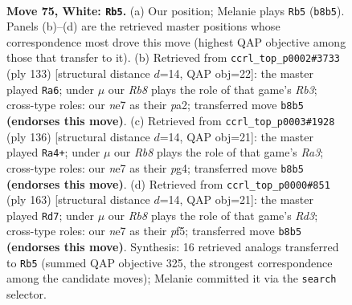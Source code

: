 \documentclass[11pt]{article}
\begin{document}
\clearpage

\begin{figure}[p]\centering
\begin{subfigure}{0.46\textwidth}\centering
\resizebox{\linewidth}{!}{%
\newchessgame
\chessboard[
  setfen={1R6/3kn3/8/8/p6r/P6p/7K/8 w - - 8 75},
  showmover=false,
  pgfstyle=straightmove, color=movearrow, markmove={b8-b5}
]}
\caption{}
\end{subfigure}\hfill
\begin{subfigure}{0.46\textwidth}\centering
\resizebox{\linewidth}{!}{%
\newchessgame
\chessboard[
  setfen={8/8/1r6/8/8/4k3/P1R1P3/K7 b - - 26 67},
  showmover=false,
  pgfstyle=straightmove, color=movearrow, markmove={b6-a6}
]}
\caption{}
\end{subfigure}
\\[4pt]
\begin{subfigure}{0.46\textwidth}\centering
\resizebox{\linewidth}{!}{%
\newchessgame
\chessboard[
  setfen={8/8/8/8/5kpr/R7/7p/7K w - - 10 69},
  showmover=false,
  pgfstyle=straightmove, color=movearrow, markmove={a3-a4}
]}
\caption{}
\end{subfigure}\hfill
\begin{subfigure}{0.46\textwidth}\centering
\resizebox{\linewidth}{!}{%
\newchessgame
\chessboard[
  setfen={7k/7P/3r4/5P1R/5K2/8/8/8 b - - 12 82},
  showmover=false,
  pgfstyle=straightmove, color=movearrow, markmove={d6-d7}
]}
\caption{}
\end{subfigure}
\caption{\textbf{Move 75, White: \texttt{Rb5}.} (a) Our position; Melanie plays \texttt{Rb5} (\texttt{b8b5}). Panels (b)--(d) are the retrieved master positions whose correspondence most drove this move (highest QAP objective among those that transfer to it). (b) Retrieved from \texttt{ccrl\_top\_p0002\#3733} (ply 133) [structural distance $d$=14, QAP obj=22]: the master played \texttt{Ra6}; under $\mu$ our \emph{Rb8} plays the role of that game's \emph{Rb3}; cross-type roles: our \emph{n}e7 as their \emph{p}a2; transferred move \texttt{b8b5} \textbf{(endorses this move)}. (c) Retrieved from \texttt{ccrl\_top\_p0003\#1928} (ply 136) [structural distance $d$=14, QAP obj=21]: the master played \texttt{Ra4+}; under $\mu$ our \emph{Rb8} plays the role of that game's \emph{Ra3}; cross-type roles: our \emph{n}e7 as their \emph{p}g4; transferred move \texttt{b8b5} \textbf{(endorses this move)}. (d) Retrieved from \texttt{ccrl\_top\_p0000\#851} (ply 163) [structural distance $d$=14, QAP obj=21]: the master played \texttt{Rd7}; under $\mu$ our \emph{Rb8} plays the role of that game's \emph{Rd3}; cross-type roles: our \emph{n}e7 as their \emph{p}f5; transferred move \texttt{b8b5} \textbf{(endorses this move)}. Synthesis: 16 retrieved analogs transferred to \texttt{Rb5} (summed QAP objective 325, the strongest correspondence among the candidate moves); Melanie committed it via the \texttt{search} selector.}
\label{fig:thought-m148}
\end{figure}
\end{document}
